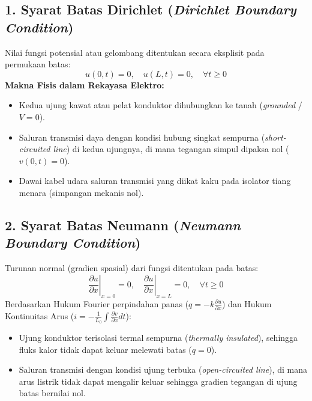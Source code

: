 \documentclass[11pt,a4paper]{article}
\theoremstyle{definition}
\begin{document}
\subsection{1. Syarat Batas Dirichlet (\textit{Dirichlet Boundary Condition})}
Nilai fungsi potensial atau gelombang ditentukan secara eksplisit pada permukaan batas:
\begin{equation}
    u(0, t) = 0, \quad u(L, t) = 0, \quad \forall t \ge 0
    \label{eq:bc_dirichlet}
\end{equation}
\textbf{Makna Fisis dalam Rekayasa Elektro:}
\begin{itemize}[leftmargin=*]
    \item Kedua ujung kawat atau pelat konduktor dihubungkan ke tanah (\textit{grounded} / $V = 0$).
    \item Saluran transmisi daya dengan kondisi hubung singkat sempurna (\textit{short-circuited line}) di kedua ujungnya, di mana tegangan simpul dipaksa nol ($v(0, t) = 0$).
    \item Dawai kabel udara saluran transmisi yang diikat kaku pada isolator tiang menara (simpangan mekanis nol).
\end{itemize}

\subsection{2. Syarat Batas Neumann (\textit{Neumann Boundary Condition})}
Turunan normal (gradien spasial) dari fungsi ditentukan pada batas:
\begin{equation}
    \left. \frac{\partial u}{\partial x} \right|_{x=0} = 0, \quad \left. \frac{\partial u}{\partial x} \right|_{x=L} = 0, \quad \forall t \ge 0
    \label{eq:bc_neumann}
\end{equation}
Berdasarkan Hukum Fourier perpindahan panas ($q = -k \frac{\partial u}{\partial x}$) dan Hukum Kontinuitas Arus ($i = -\frac{1}{L_0}\int \frac{\partial v}{\partial x} dt$):
\begin{itemize}[leftmargin=*]
    \item Ujung konduktor terisolasi termal sempurna (\textit{thermally insulated}), sehingga fluks kalor tidak dapat keluar melewati batas ($q = 0$).
    \item Saluran transmisi dengan kondisi ujung terbuka (\textit{open-circuited line}), di mana arus listrik tidak dapat mengalir keluar sehingga gradien tegangan di ujung batas bernilai nol.
\end{itemize}
\end{document}
